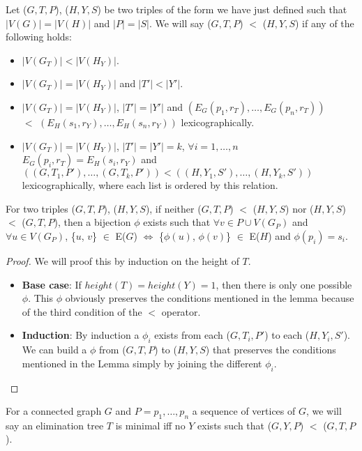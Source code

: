 \begin{definition}
Let ($G, T, P$), ($H, Y, S$) be two triples of the form we have just defined such that $|V(G)| = |V(H)|$ and $|P| = |S|$. We will say ($G, T, P$) $<$ ($H, Y, S$) if any of the following holds:
 
\begin{itemize}
\item $|V(G_T)| < |V(H_Y)|$.
\item $|V(G_T)| = |V(H_Y)|$ and $|T'| < |Y'|$.
\item $|V(G_T)| = |V(H_Y)|$, $|T'| = |Y'|$ and $(E_G(p_1, r_T), \ldots, E_G(p_n, r_T))$ \\ $ < $ $(E_H(s_1, r_Y), \ldots, E_H(s_n, r_Y))$ lexicographically.
\item $|V(G_T)| = |V(H_Y)|$, $|T'| = |Y'| = k$, $\forall i = 1, \ldots, n$ $E_G(p_i, r_T) = E_H(s_i, r_Y)$  and $((G, T_1, P'), \ldots, (G, T_k, P')) < ((H, Y_1, S'), \ldots, (H, Y_k, S'))$ lexicographically, where each list is ordered by this relation.
\end{itemize}
\end{definition}
\begin{lemma}
\label{lemma:et comparison}
For two triples ($G, T, P$), ($H, Y, S$), if neither ($G, T, P$) $<$ ($H, Y, S$) nor ($H, Y, S$) $<$ ($G, T, P$), then a  bijection $\phi$ exists such that $\forall v \in P \cup V(G_P)$ and $\forall u \in V(G_P)$, \{$u$, $v$\} $\in$ E($G$) $\iff$ \{$\phi(u)$, $\phi(v)$\} $\in$ E($H$) and $\phi(p_i) = s_i$.
\end{lemma}
 
\begin{proof}
We will proof this by induction on the height of $T$.

\begin{itemize}
  \item \textbf{Base case}:
If $height(T) = height(Y) = 1$, then there is only one possible $\phi$. This $\phi$ obviously preserves the conditions mentioned in the lemma because of the third condition of the $<$ operator.

\item \textbf{Induction}:
By induction a $\phi_i$ exists from each ($G, T_i, P'$) to each ($H, Y_i, S'$). We can build a $\phi$ from ($G, T, P$) to ($H, Y, S$) that preserves the conditions mentioned in the Lemma simply by joining the different $\phi_i$.
\end{itemize}
\end{proof}
 
\begin{definition}
For a connected graph $G$ and $P = p_1,\ldots, p_n$ a sequence of vertices of $G$, we will say an elimination tree $T$ is minimal iff no $Y$ exists such that ($G, Y, P$) $<$ ($G, T, P$).
\end{definition}

